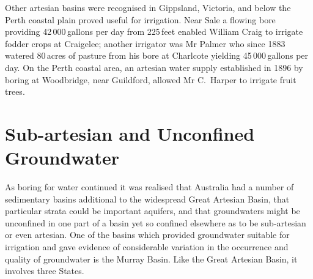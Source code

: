 Other artesian basins were recognised in Gippsland, Victoria,
 and below the Perth coastal plain proved
useful for irrigation. Near Sale  a flowing bore
providing 42\,000\,gallons per day from 225\,feet enabled William
Craig   to irrigate fodder crops at
Craigelee; another irrigator was Mr Palmer who since 1883 watered
80\,acres of pasture from his bore at Charlcote
yielding 45\,000\,gallons per day. On the Perth coastal area, an
artesian water supply established in 1896 by boring at Woodbridge,
 near Guildford, allowed Mr C.~Harper to
irrigate fruit trees.

\section*{Sub-artesian and Unconfined Groundwater}

As boring for water continued it was realised that Australia had a
number of sedimentary basins additional to the widespread Great
Artesian Basin, that particular strata could be important aquifers,
and that groundwaters might be unconfined in one part of a basin yet
so confined elsewhere as to be sub-artesian or even artesian.  One of
the basins which provided groundwater suitable for irrigation and gave
evidence of considerable variation in the occurrence and quality of
groundwater is the Murray Basin.  Like the Great Artesian Basin, it
involves three States.

